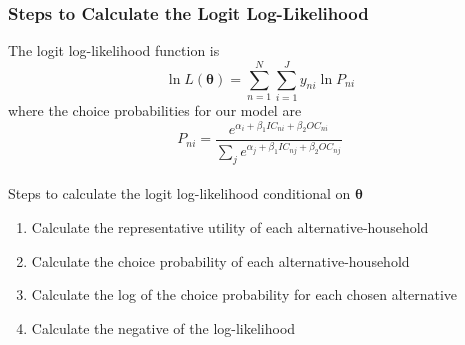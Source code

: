 \documentclass{beamer}\usepackage[]{graphicx}\usepackage[]{color}
\begin{document}
\begin{frame}\frametitle{Steps to Calculate the Logit Log-Likelihood}
    The logit log-likelihood function is
    $$\ln L(\bm{\theta}) = \sum_{n = 1}^N \sum_{i = 1}^J y_{ni} \ln P_{ni}$$
    where the choice probabilities for our model are
    $$P_{ni} = \frac{e^{\alpha_i + \beta_1 IC_{ni} + \beta_2 OC_{ni}}}{\sum_j e^{\alpha_j + \beta_1 IC_{nj} + \beta_2 OC_{nj}}}$$ \\
    \vspace{2ex}
    Steps to calculate the logit log-likelihood conditional on $\bm{\theta}$
    \begin{enumerate}
        \item Calculate the representative utility of each alternative-household
        \item Calculate the choice probability of each alternative-household
        \item Calculate the log of the choice probability for each chosen alternative
        \item Calculate the negative of the log-likelihood
    \end{enumerate}
\end{frame}
\end{document}
